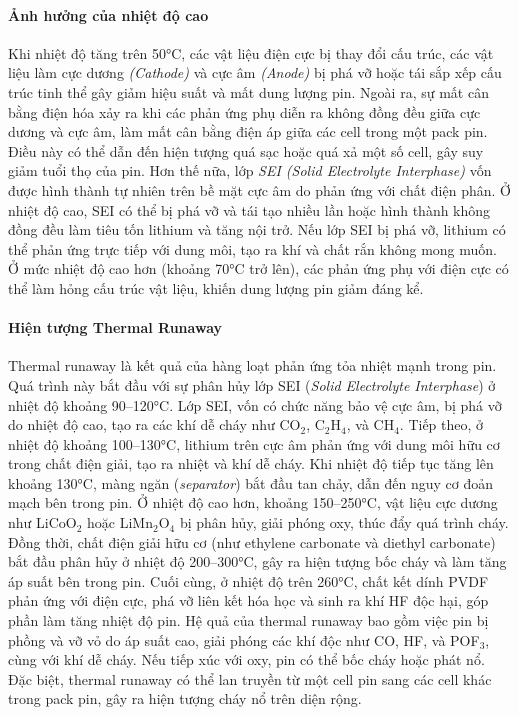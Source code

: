 \documentclass{thesis}
\begin{document}
\paragraph{Ảnh hưởng của nhiệt độ cao}\mbox{}

Khi nhiệt độ tăng trên 50°C, các vật liệu điện cực bị thay đổi cấu trúc, các vật liệu làm cực dương \textit{(Cathode)} và cực âm \textit{(Anode)} bị phá vỡ hoặc tái sắp xếp cấu trúc tinh thể gây giảm hiệu suất và mất dung lượng pin. 
Ngoài ra, sự mất cân bằng điện hóa xảy ra khi các phản ứng phụ diễn ra không đồng đều giữa cực dương và cực âm, làm mất cân bằng điện áp giữa các cell trong một pack pin. Điều này có thể dẫn đến hiện tượng quá sạc hoặc quá xả một số cell, gây suy giảm tuổi thọ của pin.
Hơn thế nữa, lớp \textit{SEI (Solid Electrolyte Interphase)} vốn được hình thành tự nhiên trên bề mặt cực âm do phản ứng với chất điện phân. Ở nhiệt độ cao, SEI có thể bị phá vỡ và tái tạo nhiều lần hoặc hình thành không đồng đều làm tiêu tốn lithium và tăng nội trở. 
Nếu lớp SEI bị phá vỡ, lithium có thể phản ứng trực tiếp với dung môi, tạo ra khí và chất rắn không mong muốn.
Ở mức nhiệt độ cao hơn (khoảng 70°C trở lên), các phản ứng phụ với điện cực có thể làm hỏng cấu trúc vật liệu, khiến dung lượng pin giảm đáng kể.\cite{ma2018temperature}

\paragraph{Hiện tượng Thermal Runaway}\mbox{}

Thermal runaway là kết quả của hàng loạt phản ứng tỏa nhiệt mạnh trong pin. Quá trình này bắt đầu với sự phân hủy lớp SEI (\textit{Solid Electrolyte Interphase}) ở nhiệt độ khoảng 90–120°C. Lớp SEI, vốn có chức năng bảo vệ cực âm, bị phá vỡ do nhiệt độ cao, tạo ra các khí dễ cháy như CO$_2$, C$_2$H$_4$, và CH$_4$. Tiếp theo, ở nhiệt độ khoảng 100–130°C, lithium trên cực âm phản ứng với dung môi hữu cơ trong chất điện giải, tạo ra nhiệt và khí dễ cháy. Khi nhiệt độ tiếp tục tăng lên khoảng 130°C, màng ngăn (\textit{separator}) bắt đầu tan chảy, dẫn đến nguy cơ đoản mạch bên trong pin. 
Ở nhiệt độ cao hơn, khoảng 150–250°C, vật liệu cực dương như LiCoO$_2$ hoặc LiMn$_2$O$_4$ bị phân hủy, giải phóng oxy, thúc đẩy quá trình cháy. Đồng thời, chất điện giải hữu cơ (như ethylene carbonate và diethyl carbonate) bắt đầu phân hủy ở nhiệt độ 200–300°C, gây ra hiện tượng bốc cháy và làm tăng áp suất bên trong pin. Cuối cùng, ở nhiệt độ trên 260°C, chất kết dính PVDF phản ứng với điện cực, phá vỡ liên kết hóa học và sinh ra khí HF độc hại, góp phần làm tăng nhiệt độ pin. 
Hệ quả của thermal runaway bao gồm việc pin bị phồng và vỡ vỏ do áp suất cao, giải phóng các khí độc như CO, HF, và POF$_3$, cùng với khí dễ cháy. Nếu tiếp xúc với oxy, pin có thể bốc cháy hoặc phát nổ. Đặc biệt, thermal runaway có thể lan truyền từ một cell pin sang các cell khác trong pack pin, gây ra hiện tượng cháy nổ trên diện rộng.\cite{WANG2012210}
\end{document}
